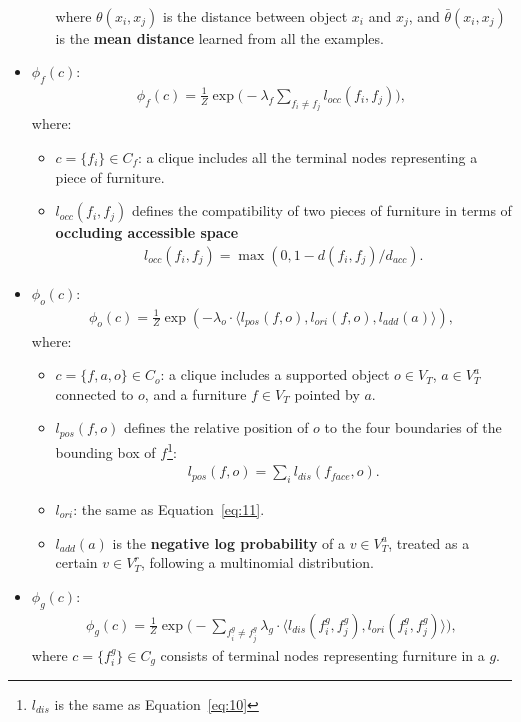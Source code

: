 \documentclass[10pt]{article}
\newcommand{\Eq}[1]{Equation~\ref{eq:#1}}
\begin{document}
\begin{itemize}
\begin{itemize}
\begin{align}
        \end{align}
        where $\theta(x_i, x_j)$ is the distance between object $x_i$ and
        $x_j$, and $\bar{\theta}(x_i, x_j)$ is the \textbf{mean distance}
        learned from all the examples.
    \end{itemize}
  \item $\phi_f(c)$:
    \begin{align}
      \label{eq:12}
      \phi_f(c) = \frac{1}{Z} \exp\biggl(-\lambda_f \sum_{f_i \neq f_j} l_{occ}(f_i, f_j) \biggr),
    \end{align}
    where:
    \begin{itemize}
      \item $c = \{f_i\} \in C_f$: a clique includes all the terminal nodes
        representing a piece of furniture.
      \item $l_{occ}(f_i, f_j)$ defines the compatibility of two pieces of
        furniture in terms of \textbf{occluding accessible space}
        \begin{align}
          \label{eq:13}
          l_{occ}(f_i, f_j) = \max(0, 1 - d(f_i, f_j) / d_{acc}).
        \end{align}
    \end{itemize}
  \item $\phi_o(c)$:
    \begin{align}
      \label{eq:14}
      \phi_o(c) = \frac{1}{Z} \exp(-\lambda_o \cdot \langle l_{pos}(f, o), l_{ori}(f, o), l_{add}(a) \rangle),
    \end{align}
    where:
    \begin{itemize}
      \item $c = \{f, a, o\} \in C_o$: a clique includes a supported object
        $o \in V_T$, $a \in V^a_T$ connected to $o$, and a furniture
        $f \in V_T$ pointed by $a$.
      \item $l_{pos}(f, o)$ defines the relative position of $o$ to the four
        boundaries of the bounding box of $f$\footnote{$l_{dis}$ is the same as
        \Eq{10}}:
        \begin{align}
          \label{eq:15}
          l_{pos}(f, o) = \sum_i l_{dis}(f_{face}, o).
        \end{align}
      \item $l_{ori}$: the same as \Eq{11}.
      \item $l_{add}(a)$ is the \textbf{negative log probability} of a
        $v \in V^a_T$, treated as a certain $v \in V^r_T$, following a
        multinomial distribution.
    \end{itemize}
  \item $\phi_g(c)$:
    \begin{align}
      \label{eq:16}
      \phi_g(c) = \frac{1}{Z} \exp\biggl(-\sum_{f^g_i \neq f^g_j} \lambda_g \cdot \langle l_{dis}(f^g_i, f^g_j), l_{ori}(f^g_i, f^g_j) \rangle\biggr),
    \end{align}
    where $c = \{f^g_i\} \in C_g$ consists of terminal nodes representing
    furniture in a $g$.
\end{itemize}
\end{document}
